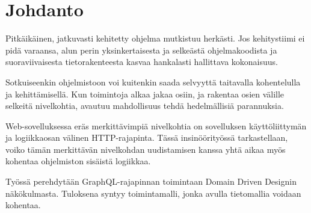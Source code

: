 \hypertarget{johdanto}{%
\chapter{Johdanto}\label{johdanto}}

Pitkäikäinen, jatkuvasti kehitetty ohjelma mutkistuu herkästi. Jos
kehitystiimi ei pidä varaansa, alun perin yksinkertaisesta ja selkeästä
ohjelmakoodista ja suoraviivaisesta tietorakenteesta kasvaa hankalasti
hallittava kokonaisuus.

Sotkuiseenkin ohjelmistoon voi kuitenkin saada selvyyttä taitavalla
kohentelulla ja kehittämisellä. Kun toimintoja alkaa jakaa osiin, ja
rakentaa osien välille selkeitä nivelkohtia, avautuu mahdollisuus tehdä
hedelmällisiä parannuksia.

Web-sovelluksessa eräs merkittävimpiä nivelkohtia on sovelluksen
käyttöliittymän ja logiikkaosan välinen HTTP-rajapinta. Tässä
insinöörityössä tarkastellaan, voiko tämän merkittävän nivelkohdan
uudistamisen kanssa yhtä aikaa myös kohentaa ohjelmiston sisäistä
logiikkaa.

Työssä perehdytään GraphQL-rajapinnan toimintaan Domain Driven Designin
näkökulmasta. Tuloksena syntyy toimintamalli, jonka avulla tietomallia
voidaan kohentaa.

